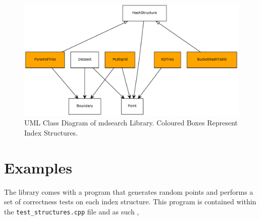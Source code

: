 \begin{figure}[H]
	\centering
	\includegraphics[scale=0.6]{figures/mdsearch_classes_uml.pdf}
	\caption{UML Class Diagram of mdsearch Library. Coloured Boxes Represent Index Structures.}
	\label{fig:library-class-diagram} 
\end{figure}

\section{Examples}

The library comes with a program that generates random points and performs a set of correctness tests on each index structure. This program is contained within the \texttt{test\_structures.cpp} file and as such ,